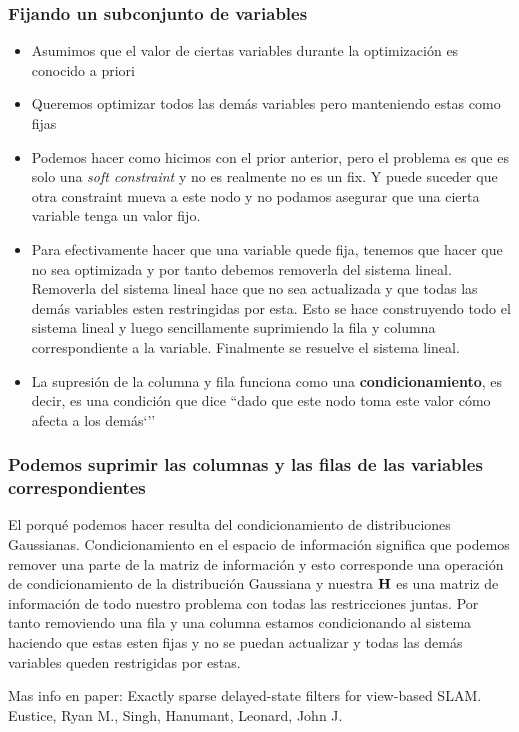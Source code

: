 \begin{frame}
    \frametitle{Fijando un subconjunto de variables}
    
    \begin{itemize}
        \item Asumimos que el valor de ciertas variables durante la optimización es conocido a priori
        \item Queremos optimizar todos las demás variables pero manteniendo estas como fijas
        \item Podemos hacer como hicimos con el prior anterior, pero el problema es que es solo una \emph{soft constraint} y no es realmente no es un fix. Y puede suceder que otra constraint mueva a este nodo y no podamos asegurar que una cierta variable tenga un valor fijo.
        \item Para efectivamente hacer que una variable quede fija, tenemos que hacer que no sea optimizada y por tanto debemos removerla del sistema lineal. Removerla del sistema lineal hace que no sea actualizada y que todas las demás variables esten restringidas por esta. Esto se hace construyendo todo el sistema lineal y luego sencillamente suprimiendo la fila y columna correspondiente a la variable. Finalmente se resuelve el sistema lineal.
        \item La supresión de la columna y fila funciona como una {\bf condicionamiento}, es decir, es una condición que dice ``dado que este nodo toma este valor cómo afecta a los demás`''
        
    \end{itemize}
    
\end{frame}

\begin{frame}
    \frametitle{Podemos suprimir las columnas y las filas de las variables correspondientes}
    El porqué podemos hacer resulta del condicionamiento de distribuciones Gaussianas.
    Condicionamiento en el espacio de información significa que podemos remover una parte de la matriz de información y esto corresponde una operación de condicionamiento de la distribución Gaussiana y nuestra $\boldsymbol{\mathbf{H}}$ es una matriz de información de todo nuestro problema con todas las restricciones juntas. Por tanto removiendo una fila y una columna estamos condicionando al sistema haciendo que estas esten fijas y no se puedan actualizar y todas las demás variables queden restrigidas por estas.
    
    Mas info en paper: Exactly sparse delayed-state filters for view-based SLAM. Eustice, Ryan M., Singh, Hanumant, Leonard, John J.
    
\end{frame}

